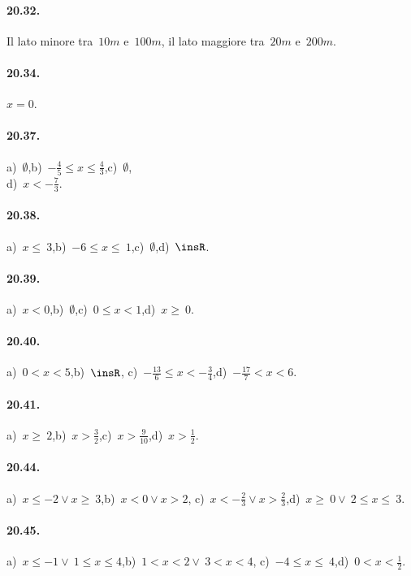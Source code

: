 \paragraph{20.32.} Il lato minore tra~$10\unit{m}$ e~$100\unit{m}$, il lato maggiore tra~$20\unit{m}$ e~$200\unit{m}$.

\paragraph{20.34.} $x = 0$.

\paragraph{20.37.} a)~$\emptyset $,\quad b)~$-{\frac{4}{5}}\le x\le\frac{4}{3}$,\quad c)~$\emptyset $,\quad
\protect\\ d)~$x<-{\frac{7}{3}}$.

\paragraph{20.38.} a)~$x\le~3$,\quad b)~$-6\le x\le~1$,\quad c)~$\emptyset $,\quad d)~$\insR$.

\paragraph{20.39.} a)~$x<0$,\quad b)~$\emptyset $,\quad c)~$0\le x<1$,\quad d)~$x\ge~0$.

\paragraph{20.40.} a)~$0<x<5$,\quad b)~$\insR$,\quad
\quad c)~$-{\frac{13}{6}}\le x<-{\frac{3}{4}}$,\quad d)~$-{\frac{17}{7}}<x<6$.

\paragraph{20.41.} a)~$x\ge~2$,\quad b)~$x>\frac{3}{2}$,\quad c)~$x>\frac{9}{10}$,\quad d)~$x>\frac{1}{2}$.

\paragraph{20.44.} a)~$x\le -2\vee x\ge~3$,\quad b)~$x<0\vee x>2$,\quad
c)~$x<-{\frac{2}{3}}\vee x>\frac{2}{3}$,\quad d)~$x\ge~0\vee~2\le x\le~3$.

\paragraph{20.45.} a)~$x\le -1\vee~1\le x\le4$,\quad b)~$1<x<2\vee~3<x<4$,\quad
c)~$-4\le x\le~4$,\quad d)~$0<x<\frac{1}{2}$.

